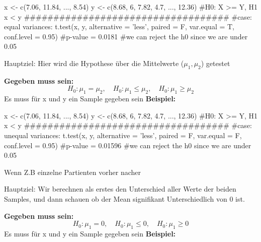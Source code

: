 \begin{rcode}{1}
x <- c(7.06, 11.84, ..., 8.54)
y <- c(8.68, 6, 7.82, 4.7, ..., 12.36)
#H0: X >= Y, H1 x < y
###################################
#case: equal variances:
t.test(x, y, alternative = 'less', paired = F, var.equal = T, conf.level = 0.95)
#p-value = 0.0181
#we can reject the h0 since we are under 0.05
\end{rcode}
\normalsize
\begin{center}
\end{center}
\normalsize
Hauptziel: Hier wird die Hypothese über die
Mittelwerte ($\mu_1, \mu_2$) getestet
\normalsize
\begin{center}
\end{center}

\large{\textbf{Gegeben muss sein:}}
\[
H_0: \mu_1 = \mu_2, \quad 
H_0: \mu_1 \leq \mu_2, \quad 
H_0: \mu_1 \geq \mu_2
\]
\textcolor{red}{\warning} Es muss für x und y ein Sample gegeben sein \textcolor{red}{\warning}
\large{\textbf{Beispiel:}}
\begin{rcode}{1}
x <- c(7.06, 11.84, ..., 8.54)
y <- c(8.68, 6, 7.82, 4.7, ..., 12.36)
#H0: X >= Y, H1 x < y
###################################
#case: unequal variances:
t.test(x, y, alternative = 'less', paired = F, var.equal = F, conf.level = 0.95)
#p-value = 0.01596
#we can reject the h0 since we are under 0.05
\end{rcode}

\columnbreak
\begin{center}
    
\end{center}
\textcolor{red}{\warning}Wenn Z.B einzelne Partienten vorher nacher\textcolor{red}{\warning}

\normalsize
Hauptziel: Wir berechnen als erstes den Unterschied aller Werte der beiden Samples, und dann schauen ob der Mean signifikant Unterschiedlich von 0 ist.
\normalsize
\begin{center}
\end{center}

\large{\textbf{Gegeben muss sein:}}
\[
H_0: \mu_1 = 0, \quad 
H_0: \mu_1 \leq 0, \quad 
H_0: \mu_1 \geq 0
\]
\textcolor{red}{\warning} Es muss für x und y ein Sample gegeben sein \textcolor{red}{\warning}
\large{\textbf{Beispiel:}}


